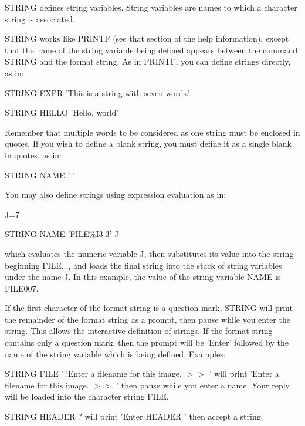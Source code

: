 STRING defines string variables.  String variables are names to which a
character string is associated.

STRING works like PRINTF (see that section of the help information), except
that the name of the string variable being defined appears between the
command STRING and the format string.  As in PRINTF, you can define strings
directly, as in:
\begin{example}
  \item[STRING EXPR  'This is a string with seven words.'\hfill]{}
  \item[STRING HELLO 'Hello, world'\hfill]{}
\end{example}
Remember that multiple words to be considered as one string must be
enclosed in quotes.  If you wish to define a blank string, you must define
it as a single blank in quotes, as in:
\begin{hanging}
  \item{STRING NAME ' '}
\end{hanging}

You may also define strings using expression evaluation as in:
\begin{hanging}
  \item{J=7}
  \item{STRING NAME 'FILE\%I3.3' J}
\end{hanging}
which evaluates the numeric variable J, then substitutes its value into the
string beginning FILE..., and loads the final string into the stack of
string variables under the name J.  In this example, the value of the
string variable NAME is FILE007.

If the first character of the format string is a question mark, STRING will
print the remainder of the format string as a prompt, then pause while you
enter the string.  This allows the interactive definition of strings.  If
the format string contains only a question mark, then the prompt will be
'Enter' followed by the name of the string variable which is being defined.
Examples:
\begin{example}
  \item[STRING FILE '?Enter a filename for this image. $>>$ '\hfill]{ will
   print 'Enter a filename for this image. $>>$ ' then pause while you
   enter a name.  Your reply will be loaded into the character string
   FILE.}

   \item[STRING HEADER ?\hfill]{ will print 'Enter HEADER ' then accept a
        string.}
\end{example}

